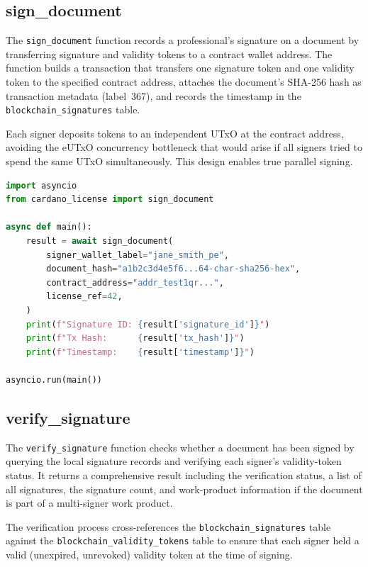 \subsection{sign\_document}

The \texttt{sign\_document} function records a professional's signature on a
document by transferring signature and validity tokens to a contract wallet
address.  The function builds a transaction that transfers one signature
token and one validity token to the specified contract address, attaches the
document's SHA-256 hash as transaction metadata (label~367), and records the
timestamp in the \texttt{blockchain\_signatures} table.

Each signer deposits tokens to an independent UTxO at the contract address,
avoiding the eUTxO concurrency bottleneck that would arise if all signers
tried to spend the same UTxO simultaneously.  This design enables true
parallel signing.

\begin{lstlisting}[language=Python,
  caption={Signing a document with credential tokens.}]
import asyncio
from cardano_license import sign_document

async def main():
    result = await sign_document(
        signer_wallet_label="jane_smith_pe",
        document_hash="a1b2c3d4e5f6...64-char-sha256-hex",
        contract_address="addr_test1qr...",
        license_ref=42,
    )
    print(f"Signature ID: {result['signature_id']}")
    print(f"Tx Hash:      {result['tx_hash']}")
    print(f"Timestamp:    {result['timestamp']}")

asyncio.run(main())
\end{lstlisting}

\subsection{verify\_signature}

The \texttt{verify\_signature} function checks whether a document has been
signed by querying the local signature records and verifying each signer's
validity-token status.  It returns a comprehensive result including the
verification status, a list of all signatures, the signature count, and
work-product information if the document is part of a multi-signer work
product.

The verification process cross-references the
\texttt{blockchain\_signatures} table against the
\texttt{blockchain\_validity\_tokens} table to ensure that each signer held
a valid (unexpired, unrevoked) validity token at the time of signing.

